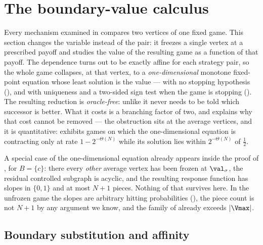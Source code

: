 
\section{The boundary-value calculus}\label{sec:bv}

Every mechanism examined in  compares two vertices of one
fixed game. This section changes the variable instead of the pair: it
freezes a single vertex at a prescribed payoff and studies the value of
the resulting game as a function of that payoff. The dependence turns out
to be exactly affine for each strategy pair, so the whole game collapses,
at that vertex, to a \emph{one-dimensional} monotone fixed-point equation
whose least solution is the value --- with no stopping hypothesis
(), and with uniqueness and a two-sided sign test when
the game is stopping (). The
resulting reduction is \emph{oracle-free}: unlike 
it never needs to be told which successor is better. What it costs is a
branching factor of two, and  explains why that cost
cannot be removed --- the obstruction sits at the average vertices, and it
is quantitative:  exhibits games on which the
one-dimensional equation is contracting only at rate $1-2^{-\Theta(N)}$
while its solution lies within $2^{-\Theta(N)}$ of $\tfrac12$.

A special case of the one-dimensional equation already appears inside the
proof of , for $B=\{c\}$: there every \emph{other}
average vertex has been frozen at $\val_\sigma$, the residual controlled
subgraph is acyclic, and the resulting response function has slopes in
$\{0,1\}$ and at most $N+1$ pieces. Nothing of that survives here. In the
unfrozen game the slopes are arbitrary hitting probabilities
(), the piece count is not $N+1$ by any argument we
know, and the family of  already exceeds $|\Vmax|$.

\subsection{Boundary substitution and affinity}

